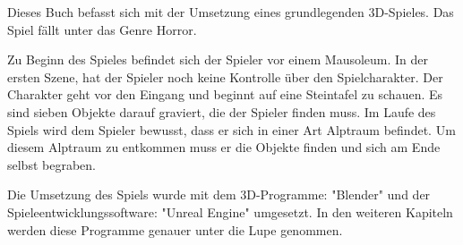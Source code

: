 Dieses Buch befasst sich mit der Umsetzung eines grundlegenden 3D-Spieles.
Das Spiel fällt unter das Genre Horror.

Zu Beginn des Spieles befindet sich der Spieler vor einem Mausoleum.
In der ersten Szene, hat der Spieler noch keine Kontrolle über den Spielcharakter.
Der Charakter geht vor den Eingang und beginnt auf eine Steintafel zu schauen.
Es sind sieben Objekte darauf graviert, die der Spieler finden muss.
Im Laufe des Spiels wird dem Spieler bewusst, dass er sich in einer Art Alptraum befindet.
Um diesem Alptraum zu entkommen muss er die Objekte finden und sich am Ende selbst begraben.

Die Umsetzung des Spiels wurde mit dem 3D-Programme: "Blender" und der Spieleentwicklungssoftware: "Unreal Engine" umgesetzt.
In den weiteren Kapiteln werden diese Programme genauer unter die Lupe genommen.